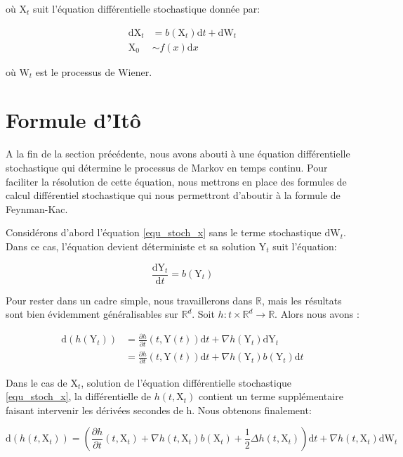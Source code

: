 \documentclass[11pt]{article}
\theoremstyle{definition}
\theoremstyle{remark}
\begin{document}
où $\mathrm{X}_{t}$ suit l’équation différentielle stochastique donnée par: 

\begin{align}
\label{equ_stoch_x}
\mathrm{dX}_{t} &= b(\mathrm{X}_{t})\mathrm{d}t + \mathrm{dW}_{t} \\
\mathrm{X}_{0} &\sim f(x)\mathrm{d}x
\end{align}

où $\mathrm{W}_{t}$ est le processus de Wiener.

\section{Formule d'Itô}

A la fin de la section précédente, nous avons abouti à une équation différentielle stochastique qui détermine le processus de Markov en temps continu. Pour faciliter la résolution de cette équation, nous  mettrons en place des formules de calcul différentiel stochastique qui nous permettront d'aboutir à la formule de Feynman-Kac. 

Considérons d'abord l’équation \eqref{equ_stoch_x} sans le terme stochastique $\mathrm{dW}_{t}$. Dans ce cas, l'équation devient déterministe et sa solution $\mathrm{Y}_t$ suit l'équation:

\begin{equation}
\frac{\mathrm{dY}_{t}}{\mathrm{d}t} = b(\mathrm{Y}_t) 
\end{equation}

Pour rester dans un cadre simple, nous travaillerons dans $\mathbb{R}$, mais les résultats sont bien évidemment généralisables sur $\mathbb{R}^d$. Soit $h: t \times \mathbb{R}^d \rightarrow \mathbb{R}$. Alors nous avons : 

\begin{align*}
\mathrm{d}(h(\mathrm{Y}_{t})) &= \frac{\partial h}{\partial t}(t,\mathrm{Y}(t)) \mathrm{d}t + \nabla h(\mathrm{Y}_{t}) \mathrm{dY}_{t} \\
&= \frac{\partial h}{\partial t}(t,\mathrm{Y}(t)) \mathrm{d}t + \nabla h(\mathrm{Y}_{t}) b(\mathrm{Y}_{t})\mathrm{d}t
\end{align*}

Dans le cas de $\mathrm{X}_{t}$, solution de l'équation différentielle stochastique \eqref{equ_stoch_x}, la différentielle de $h(t, \mathrm{X}_t)$ contient un terme supplémentaire faisant intervenir les dérivées secondes de h. Nous obtenons finalement:

\begin{equation}
\mathrm{d}(h(t,\mathrm{X}_t)) = ( \frac{\partial h}{\partial t}(t, \mathrm{X}_t) + \nabla h(t,\mathrm{X}_t) b(\mathrm{X}_t) + \frac{1}{2} \Delta h(t,\mathrm{X}_t) )\mathrm{d}t + \nabla h(t,\mathrm{X}_t) \mathrm{dW}_{t}
\end{equation}
\end{document}
